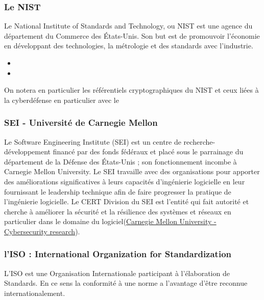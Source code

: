 \subsubsection{Le NIST}
Le National Institute of Standards and Technology, ou NIST est une agence du département du Commerce des États-Unis. Son but est de promouvoir l'économie en développant des technologies, la métrologie et des standards avec l'industrie. 

\begin{itemize}
  \item {}
  \item {}
\end{itemize}

On notera en particulier les référentiels cryptographiques du NIST et ceux liées à la cyberdéfense en particulier avec le 

\subsubsection{SEI - Université de Carnegie Mellon}

Le Software Engineering Institute (SEI) est un centre de recherche-développement financé par des fonds fédéraux et placé sous le parrainage du département de la Défense des États-Unis ; son fonctionnement incombe à Carnegie Mellon University. Le SEI travaille avec des organisations pour apporter des améliorations significatives à leurs capacités d’ingénierie logicielle en leur fournissant le leadership technique afin de faire progresser la pratique de l’ingénierie logicielle. Le CERT Division du SEI est l’entité qui fait autorité et cherche à améliorer la sécurité et la résilience des systèmes et réseaux en particulier dans le domaine du logiciel(\href{https://www.sei.cmu.edu/research-capabilities/cybersecurity/}{Carnegie Mellon University - Cybersecurity research}).

\subsubsection{l'ISO : International Organization for Standardization }


L’ISO est une Organisation Internationale participant à l’élaboration de Standards. En ce sens la conformité à une norme a l’avantage d’être reconnue internationalement.
 

